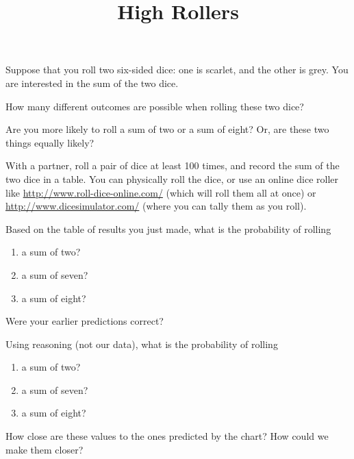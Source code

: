 \documentclass[handout]{ximera}
\title{High Rollers}
\begin{document}
\begin{abstract}
\end{abstract}
\maketitle


Suppose that you roll two six-sided dice: one is scarlet, and the other is grey.  You are interested in the sum of the two dice.

\begin{problem}
How many different outcomes are possible when rolling these two dice?
\end{problem}

\begin{problem} 
Are you more likely to roll a sum of two or a sum of eight?  Or, are these two things equally likely?
\end{problem}

With a partner, roll a pair of dice at least 100 times, and record the sum of the two dice in a table.  You can physically roll the dice, or use an online dice roller like \url{http://www.roll-dice-online.com/} (which will roll them all at once) or \url{http://www.dicesimulator.com/} (where you can tally them as you roll).


\begin{problem}
Based on the table of results you just made, what is the probability of rolling
\begin{enumerate}
\item a sum of two?
\item a sum of seven?
\item a sum of eight?
\end{enumerate}
Were your earlier predictions correct?
\end{problem}

\begin{problem}
Using reasoning (not our data), what is the probability of rolling
\begin{enumerate}
\item a sum of two?
\item a sum of seven?
\item a sum of eight?
\end{enumerate}
How close are these values to the ones predicted by the chart?  How could we make them closer?
\end{problem}

\newpage
\end{document}
